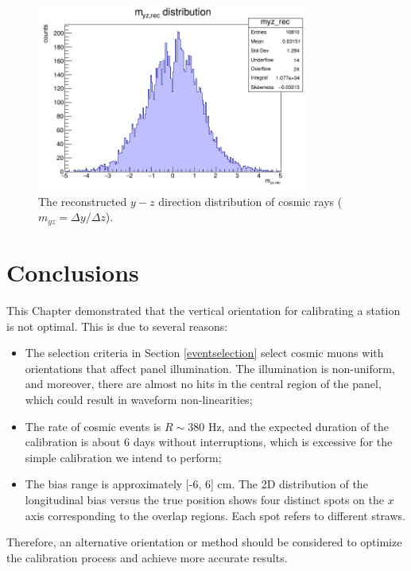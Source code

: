 \begin{figure}[!h]
    \centering
    \includegraphics[width=0.8\textwidth]{figures/png/myz_rec.png}
    \caption[The reconstructed $y-z$ direction distribution of cosmic rays.]{The reconstructed $y-z$ direction distribution of cosmic rays ($m_{yz}=\Delta y /\Delta z$).}
    \label{fig:myzrec}
\end{figure}
\section{Conclusions}
This Chapter demonstrated that the vertical orientation for calibrating a station is not optimal. This is due to several reasons:
\begin{itemize}
    \item The selection criteria in Section \ref{eventselection} select cosmic muons with orientations that affect panel illumination. 
    The illumination is non-uniform, and moreover, there are almost no hits in the central region of the panel, which could result in waveform non-linearities;
    \item The rate of cosmic events is $R \sim 380$ Hz, and the expected duration of the calibration is about 6 days without interruptions, 
    which is excessive for the simple calibration we intend to perform;
    \item The bias range is approximately [-6, 6] cm. The 2D distribution of the longitudinal bias versus the true position shows 
    four distinct spots on the $x$ axis corresponding to the overlap regions. Each spot refers to different straws.
\end{itemize}
Therefore, an alternative orientation or method should be considered to optimize the calibration process and achieve more accurate results.







